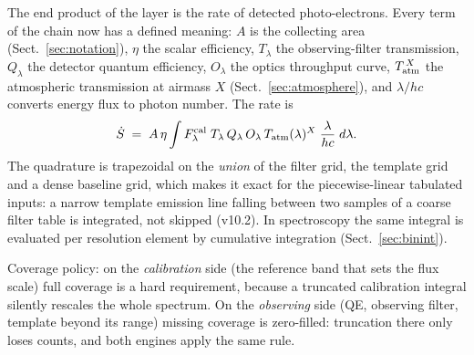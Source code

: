 The end product of the layer is the rate of detected photo-electrons.
Every term of the chain now has a defined meaning: $A$ is the collecting
area (Sect.~\ref{sec:notation}), $\eta$ the scalar efficiency,
$T_\lambda$ the observing-filter transmission, $Q_\lambda$ the detector
quantum efficiency, $O_\lambda$ the optics throughput curve,
$T_{\rm atm}^{\,X}$ the atmospheric transmission at airmass $X$
(Sect.~\ref{sec:atmosphere}), and $\lambda/hc$ converts energy flux to
photon number. The rate is
\begin{equation}
  \dot S \;=\; A\,\eta \int
  F_\lambda^{\rm cal}\; T_\lambda\, Q_\lambda\, O_\lambda\,
  T_{\rm atm}(\lambda)^{X}\;
  \frac{\lambda}{hc}\; d\lambda .
  \label{eq:rate}
\end{equation}
The quadrature is trapezoidal on the \emph{union} of the filter grid, the
template grid and a dense baseline grid, which makes it exact for the
piecewise-linear tabulated inputs: a narrow template emission line falling
between two samples of a coarse filter table is integrated, not skipped
(v10.2). In spectroscopy the same integral is evaluated per resolution
element by cumulative integration (Sect.~\ref{sec:binint}).

Coverage policy: on the \emph{calibration} side (the reference band that
sets the flux scale) full coverage is a hard requirement, because a
truncated calibration integral silently rescales the whole spectrum. On
the \emph{observing} side (QE, observing filter, template beyond its
range) missing coverage is zero-filled: truncation there only loses
counts, and both engines apply the same rule.
